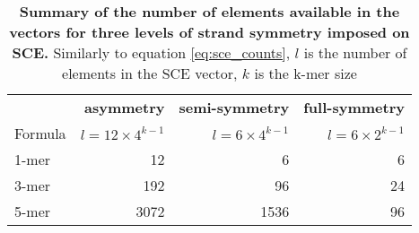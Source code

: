 \begin{table}[hp!]
\centering
\caption{\textbf{Summary of the number of elements available in the vectors for three levels of strand symmetry imposed on SCE.} Similarly to equation \ref{eq:sce_counts}, $l$ is the number of elements in the SCE vector, $k$ is the k-mer size}
\label{tab:sce_symmetric}
\begin{tabulary}{\textwidth}{ lrrr }
\toprule
 & \textbf{asymmetry} & \textbf{semi-symmetry} & \textbf{full-symmetry} \\
 Formula & $l = 12 \times 4^{k-1}$ & $l = 6 \times 4^{k-1}$ & $l = 6 \times 2^{k-1}$ \\
\hline

1-mer & 12 & 6 & 6 \\
3-mer & 192 & 96 & 24 \\
5-mer & 3072 & 1536 & 96 \\

\bottomrule

\end{tabulary}
\end{table}
